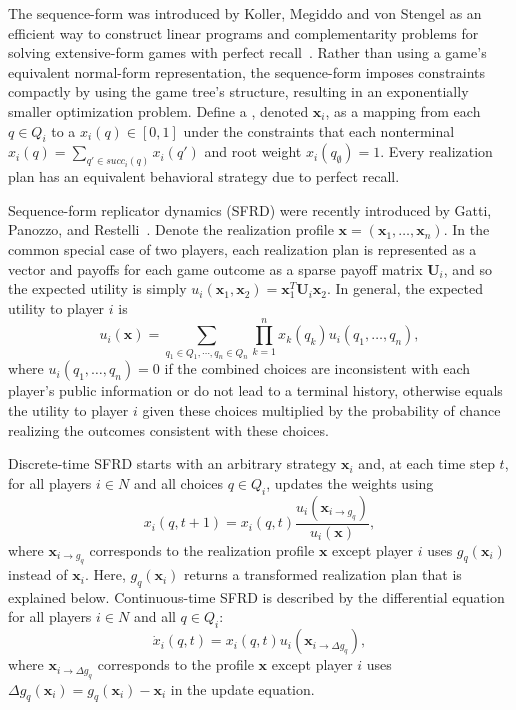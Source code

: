 \documentclass{aamas2014}
\newcommand{\bx}{\mathbf{x}}
\newcommand{\bU}{\mathbf{U}}
\newcommand{\defword}[1]{\textbf{\boldmath{#1}}}
\begin{document}
The sequence-form was introduced by Koller, Megiddo and von Stengel as an efficient way to construct
linear programs and complementarity problems for solving extensive-form games with perfect recall~\cite{SequenceFormLPs}. Rather than using a
game's equivalent normal-form representation, the sequence-form imposes constraints compactly by using the game tree's structure, 
resulting in an exponentially smaller optimization problem.
Define a \defword{realization plan}, denoted $\bx_i$, as a mapping from each $q \in Q_i$ to a \defword{realization weight} 
$x_i(q) \in [0,1]$ under the constraints that each nonterminal $x_i(q) = \sum_{q' \in succ_i(q)} x_i(q')$ and root weight $x_i(q_{\emptyset}) = 1$. 
Every realization plan has an equivalent behavioral strategy due to perfect recall. 

Sequence-form replicator dynamics (SFRD) were recently introduced by Gatti, Panozzo, and Restelli~\cite{Gatti13Efficient}. 
Denote the realization profile $\bx = (\bx_1, \ldots, \bx_n)$. 
In the common special case of two players, each realization plan is represented as a vector and 
payoffs for each game outcome
as a sparse payoff matrix $\bU_i$, 
and so the expected utility is simply $u_i(\bx_1, \bx_2) = \bx_1^T \bU_i \bx_2$. 
In general, the expected utility to player $i$ is  
\begin{equation}
\label{eq:util}
u_i(\bx) = \sum_{q_1 \in Q_1, \cdots, q_n \in Q_n} \prod_{k=1}^n x_k(q_k) u_i(q_1, \ldots, q_n),
\end{equation}
where $u_i(q_1, \ldots, q_n) = 0$ if the combined choices are inconsistent with each player's public information 
or do not lead to a terminal history, otherwise  
equals the utility to player $i$ given these choices multiplied by the probability of chance realizing the outcomes 
consistent with these choices. 

Discrete-time SFRD starts with an arbitrary strategy $\bx_i$ and, at each time step $t$, for all players $i \in N$ and all 
choices $q \in Q_i$, updates the weights using
\begin{equation}
\label{eq:dt-sfrd}
x_i(q,t+1) = x_i(q,t) \frac{u_i(\bx_{i \rightarrow g_{q}})}{u_i(\bx)},
\end{equation}
where $\bx_{i \rightarrow g_q}$ corresponds to the realization profile $\bx$ except player $i$ uses $g_q(\bx_i)$ instead of $\bx_i$. 
Here, $g_q(\bx_i)$ returns a transformed realization plan that is explained below. 
Continuous-time SFRD is described by the differential equation for all players $i \in N$ and all $q \in Q_i$:
\begin{equation}
\label{eq:ct-sfrd}
\dot{x}_i(q,t) = x_i(q,t) u_i(\bx_{i \rightarrow \Delta g_{q}}),
\end{equation}
where $\bx_{i \rightarrow \Delta g_q}$ corresponds to the profile $\bx$ except player $i$ uses $\Delta g_q(\bx_i) = g_q(\bx_i) - \bx_i$
in the update equation. 
\end{document}
